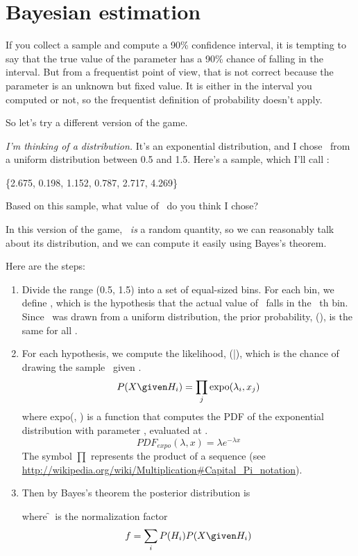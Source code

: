 \documentclass[12pt]{book}
\begin{document}


\section{Bayesian estimation}

If you collect a sample and compute a 90\% confidence interval, it is
tempting to say that the true value of the parameter has a 90\% chance
of falling in the interval.  But from a frequentist point of view,
that is not correct because the parameter is an unknown but fixed
value.  It is either in the interval you computed or not, so the
frequentist definition of probability doesn't apply.

So let's try a different version of the game.

{\em I'm thinking of a distribution.}  It's an exponential
distribution, and I chose \mylambda~from a uniform distribution
between 0.5 and 1.5.  Here's a sample, which I'll call \X:

\{2.675, 0.198, 1.152, 0.787, 2.717, 4.269\}

Based on this sample, what value of \mylambda~do you think I chose?

In this version of the game, \mylambda~{\em is} a random quantity, so we
can reasonably talk about its distribution, and we can compute it
easily using Bayes's theorem.

Here are the steps:

\begin{enumerate}

\item Divide the range (0.5, 1.5) into a set of equal-sized bins.
For each bin, we define \HH{}, which is the hypothesis that the
actual value of \mylambda~falls in the \ii~th bin.
Since \mylambda~was drawn from a uniform distribution, the prior
probability, \Prob(\HH{}), is the same for all \ii.

\item For each hypothesis, we compute the likelihood, \Prob(\X|\HH{}),
which is the chance of drawing the sample \X~given \HH{}.
%
\[ P(X \given H_i) = \prod_j \mathrm{expo}(\lambda_i, x_j)  \]
%
where expo(\mylambda, \x) is a function that
computes the PDF of the exponential distribution with parameter \mylambda,
evaluated at \x.  
%
\[ PDF_{expo}(\lambda, x) = \lambda e^{-\lambda x}\]
%
The symbol $\prod$ represents the product of a sequence (see
\url{http://wikipedia.org/wiki/Multiplication#Capital_Pi_notation}).

\item Then by Bayes's theorem the posterior distribution is


where \f~is the normalization factor
%
\[ f = \sum_i P(H_i) P(X \given H_i) \]
%
\end{enumerate}
\end{document}
